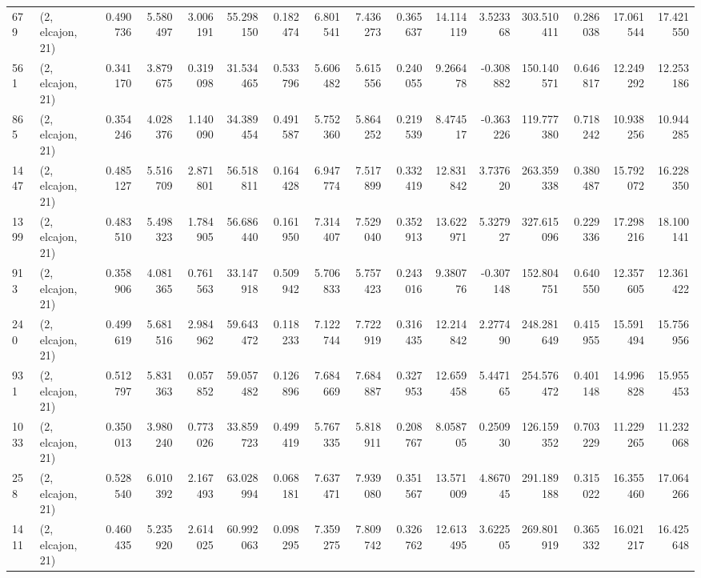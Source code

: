 \begin{tabular}{llrrrrrrrrrrrrrr}
679  &  (2, elcajon, 21) &   0.490736 &   5.580497 &   3.006191 &     55.298150 &    0.182474 &    6.801541 &    7.436273 &  0.365637 &  14.114119 &   3.523368 &   303.510411 &   0.286038 &  17.061544 &  17.421550 \\
561  &  (2, elcajon, 21) &   0.341170 &   3.879675 &   0.319098 &     31.534465 &    0.533796 &    5.606482 &    5.615556 &  0.240055 &   9.266478 &  -0.308882 &   150.140571 &   0.646817 &  12.249292 &  12.253186 \\
865  &  (2, elcajon, 21) &   0.354246 &   4.028376 &   1.140090 &     34.389454 &    0.491587 &    5.752360 &    5.864252 &  0.219539 &   8.474517 &  -0.363226 &   119.777380 &   0.718242 &  10.938256 &  10.944285 \\
1447 &  (2, elcajon, 21) &   0.485127 &   5.516709 &   2.871801 &     56.518811 &    0.164428 &    6.947774 &    7.517899 &  0.332419 &  12.831842 &   3.737620 &   263.359338 &   0.380487 &  15.792072 &  16.228350 \\
1399 &  (2, elcajon, 21) &   0.483510 &   5.498323 &   1.784905 &     56.686440 &    0.161950 &    7.314407 &    7.529040 &  0.352913 &  13.622971 &   5.327927 &   327.615096 &   0.229336 &  17.298216 &  18.100141 \\
913  &  (2, elcajon, 21) &   0.358906 &   4.081365 &   0.761563 &     33.147918 &    0.509942 &    5.706833 &    5.757423 &  0.243016 &   9.380776 &  -0.307148 &   152.804751 &   0.640550 &  12.357605 &  12.361422 \\
240  &  (2, elcajon, 21) &   0.499619 &   5.681516 &   2.984962 &     59.643472 &    0.118233 &    7.122744 &    7.722919 &  0.316435 &  12.214842 &   2.277490 &   248.281649 &   0.415955 &  15.591494 &  15.756956 \\
931  &  (2, elcajon, 21) &   0.512797 &   5.831363 &   0.057852 &     59.057482 &    0.126896 &    7.684669 &    7.684887 &  0.327953 &  12.659458 &   5.447165 &   254.576472 &   0.401148 &  14.996828 &  15.955453 \\
1033 &  (2, elcajon, 21) &   0.350013 &   3.980240 &   0.773026 &     33.859723 &    0.499419 &    5.767335 &    5.818911 &  0.208767 &   8.058705 &   0.250930 &   126.159352 &   0.703229 &  11.229265 &  11.232068 \\
258  &  (2, elcajon, 21) &   0.528540 &   6.010392 &   2.167493 &     63.028994 &    0.068181 &    7.637471 &    7.939080 &  0.351567 &  13.571009 &   4.867045 &   291.189188 &   0.315022 &  16.355460 &  17.064266 \\
1411 &  (2, elcajon, 21) &   0.460435 &   5.235920 &   2.614025 &     60.992063 &    0.098295 &    7.359275 &    7.809742 &  0.326762 &  12.613495 &   3.622505 &   269.801919 &   0.365332 &  16.021217 &  16.425648 \\

\end{tabular}
